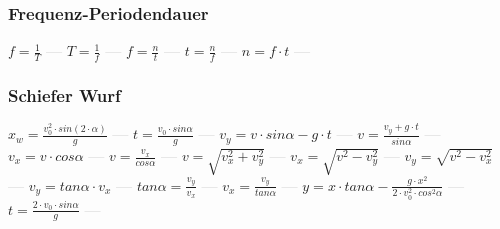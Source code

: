 \subsubsection{Frequenz-Periodendauer} 
\begin{minipage}{0.45\textwidth} 
\end{minipage} 
\begin{minipage}{0.45\textwidth} 
 
\end{minipage} 
$ f = \frac{1}{T} $ \textcolor{lightgray}{\textbf{---}} 
$ T = \frac{1}{f} $ \textcolor{lightgray}{\textbf{---}} 
$ f = \frac{n}{t} $ \textcolor{lightgray}{\textbf{---}} 
$ t = \frac{n}{f} $ \textcolor{lightgray}{\textbf{---}} 
$ n = f\cdot t $ \textcolor{lightgray}{\textbf{---}} 

\subsubsection{Schiefer Wurf} 
\begin{minipage}{0.45\textwidth} 
\end{minipage} 
\begin{minipage}{0.45\textwidth} 
 
\end{minipage} 
$ x_{w}  = \frac{v_{0} ^{2} \cdot sin(2\cdot \alpha )}{       g} $ \textcolor{lightgray}{\textbf{---}} 
$ t =\frac{v_{0} \cdot sin \alpha }{  g} $ \textcolor{lightgray}{\textbf{---}} 
$ v_{y}  =  v\cdot sin\alpha - g\cdot t $ \textcolor{lightgray}{\textbf{---}} 
$ v= \frac{ v_{y} +g\cdot t}{ sin\alpha } $ \textcolor{lightgray}{\textbf{---}} 
$ v_{x}  = v\cdot  cos\alpha $ \textcolor{lightgray}{\textbf{---}} 
$ v= \frac{ v_{x} }{ cos\alpha } $ \textcolor{lightgray}{\textbf{---}} 
$ v= \sqrt{ v_{x} ^{2} + v_{y} ^{2} } $ \textcolor{lightgray}{\textbf{---}} 
$ v_{x} = \sqrt{ v^{2}  - v_{y} ^{2} } $ \textcolor{lightgray}{\textbf{---}} 
$ v_{y} = \sqrt{ v^{2}  - v_{x} ^{2} } $ \textcolor{lightgray}{\textbf{---}} 
$ v_{y} = tan \alpha \cdot  v_{x} $ \textcolor{lightgray}{\textbf{---}} 
$ tan \alpha = \frac{v_{y} }{v_{x} } $ \textcolor{lightgray}{\textbf{---}} 
$ v_{x} = \frac{v_{y} }{tan \alpha } $ \textcolor{lightgray}{\textbf{---}} 
$ y = x\cdot tan \alpha  - \frac{   g\cdot x^{2} }{2\cdot v^{2} _{0} \cdot cos ^{2}\alpha } $ \textcolor{lightgray}{\textbf{---}} 
$ t =\frac{2\cdot v_{0} \cdot sin \alpha }{ g} $ \textcolor{lightgray}{\textbf{---}} 

